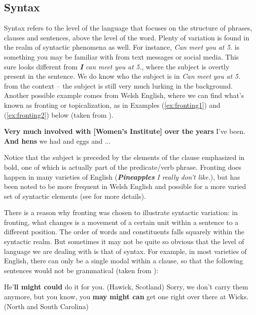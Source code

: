 \subsection{Syntax}\label{syntax}
\largerpage
Syntax refers to the level of the language that focuses on the structure of phrases, clauses and sentences, above the level of the word. Plenty of variation is found in the realm of syntactic phenomena as well. For instance, \textit{Can meet you at 5.} is something you may be familiar with from text messages or social media. This sure looks different from \textit{\textbf{I} can meet you at 5.}, where the subject is overtly present in the sentence. We do know who the subject is in \textit{Can meet you at 5.} from the context -- the subject is still very much lurking in the background. Another possible example comes from Welsh English, where we can find what's known as fronting or topicalization, as in Examples (\ref{ex:fronting1}) and (\ref{ex:fronting2}) below (taken from \citealp[158 and 160]{Paulasto2006}).

\begin{exe}
    \ex\label{ex:fronting1} \textbf{Very much involved with [Women's Institute] over the years} I've been.
    \ex\label{ex:fronting2} \textbf{And hens} we had and eggs and ... 
\end{exe}

\noindent Notice that the subject is preceded by the elements of the clause emphasized in bold, one of which is actually part of the predicate/verb phrase. Fronting does happen in many varieties of English (\textit{\textbf{Pineapples} I really don't like.}), but has been noted to be more frequent in Welsh English and possible for a more varied set of syntactic elements (see \citealp{Paulasto2006} for more details).

There is a reason why fronting was chosen to illustrate syntactic variation: in fronting, what changes is a movement of a certain unit within a sentence to a different position. The order of words and constituents falls squarely within the syntactic realm. But sometimes it may not be quite so obvious that the level of language we are dealing with is that of syntax. For example, in most varieties of English, there can only be a single modal within a clause, so that the following sentences would not be grammatical (taken from \citealp[17--18]{Bour2015}):

\begin{exe}
    \ex\label{ex:mightcould} He'\textbf{ll might could} do it for you. \hfill (Hawick, Scotland)
    \ex Sorry, we don't carry them anymore, but you know, 
    you \textbf{may might can} get one right over there at Wicks. \hfill (North and South Carolina)
\end{exe}

